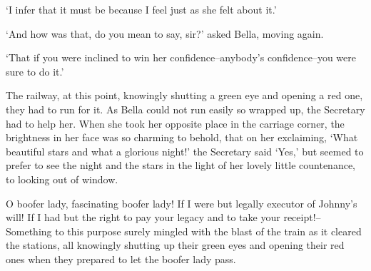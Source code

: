 ‘I infer that it must be because I feel just as she felt about it.’

‘And how was that, do you mean to say, sir?’ asked Bella, moving again.

‘That if you were inclined to win her confidence--anybody’s
confidence--you were sure to do it.’

The railway, at this point, knowingly shutting a green eye and opening
a red one, they had to run for it. As Bella could not run easily so
wrapped up, the Secretary had to help her. When she took her opposite
place in the carriage corner, the brightness in her face was so charming
to behold, that on her exclaiming, ‘What beautiful stars and what a
glorious night!’ the Secretary said ‘Yes,’ but seemed to prefer to see
the night and the stars in the light of her lovely little countenance,
to looking out of window.

O boofer lady, fascinating boofer lady! If I were but legally executor
of Johnny’s will! If I had but the right to pay your legacy and to take
your receipt!--Something to this purpose surely mingled with the blast
of the train as it cleared the stations, all knowingly shutting up their
green eyes and opening their red ones when they prepared to let the
boofer lady pass.



